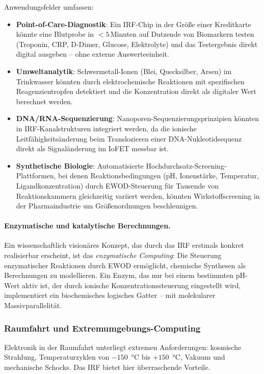 ﻿\documentclass[a4paper,12pt]{scrreprt}
\theoremstyle{definition}
\begin{document}
Anwendungsfelder umfassen:
\begin{itemize}
	\item \textbf{Point-of-Care-Diagnostik}: Ein IRF-Chip in der Größe einer
	Kreditkarte könnte eine Blutprobe in $< 5$\,Minuten auf Dutzende von
	Biomarkern testen (Troponin, CRP, D-Dimer, Glucose, Elektrolyte) und
	das Testergebnis direkt digital ausgeben -- ohne externe Auswerteeinheit.
	\item \textbf{Umweltanalytik}: Schwermetall-Ionen (Blei, Quecksilber,
	Arsen) im Trinkwasser könnten durch elektrochemische Reaktionen mit
	spezifischen Reagenzientropfen detektiert und die Konzentration direkt
	als digitaler Wert berechnet werden.
	\item \textbf{DNA/RNA-Sequenzierung}: Nanoporen-Sequenzierungsprinzipien
	könnten in IRF-Kanalstrukturen integriert werden, da die ionische
	Leitfähigkeitsänderung beim Translozieren einer DNA-Nukleotidsequenz
	direkt als Signaländerung im IoFET messbar ist.
	\item \textbf{Synthetische Biologie}: Automatisierte Hochdurchsatz-Screening-
	Plattformen, bei denen Reaktionsbedingungen (pH, Ionenstärke, Temperatur,
	Ligandkonzentration) durch EWOD-Steuerung für Tausende von Reaktionskammern
	gleichzeitig variiert werden, könnten Wirkstoffscreening in der
	Pharmaindustrie um Größenordnungen beschleunigen.
\end{itemize}

\paragraph{Enzymatische und katalytische Berechnungen.}
Ein wissenschaftlich visionäres Konzept, das durch das IRF erstmals konkret
realisierbar erscheint, ist das \emph{enzymatische Computing}: Die Steuerung
enzymatischer Reaktionen durch EWOD ermöglicht, chemische Synthesen als
Berechnungen zu modellieren. Ein Enzym, das nur bei einem bestimmten
pH-Wert aktiv ist, der durch ionische Konzentrationssteuerung eingestellt
wird, implementiert ein biochemisches logisches Gatter -- mit molekularer
Massivparallelität.

\subsubsection{Raumfahrt und Extremumgebungs-Computing}
\label{subsubsec:raumfahrt}

Elektronik in der Raumfahrt unterliegt extremen Anforderungen: kosmische
Strahlung, Temperaturzyklen von $-150$\, °C bis $+150$\, °C, Vakuum und
mechanische Schocks. Das IRF bietet hier überraschende Vorteile.
\end{document}
